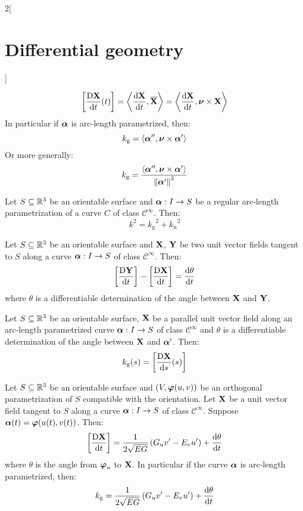 \documentclass[../../../main_math.tex]{subfiles}
\begin{document}
\begin{multicols}{2}[\section{Differential geometry}]
\begin{proposition}
    $$\left[\frac{\text{D}\boldsymbol{\mathrm{X}}}{\dd{t}}(t)\right]=\left\langle\dv{\boldsymbol{\mathrm{X}}}{t},\boldsymbol{\mathrm{\overline{X}}}\right\rangle=\left\langle\dv{\boldsymbol{\mathrm{X}}}{t},\boldsymbol{\mathrm{\nu}}\times\boldsymbol{\mathrm{X}}\right\rangle$$
    In particular if $\boldsymbol{\mathrm{\alpha}}$ is arc-length parametrized, then: $$k_\text{g}=\langle\boldsymbol{\mathrm{\alpha}}'',\boldsymbol{\mathrm{\nu}}\times\boldsymbol{\mathrm{\alpha}}'\rangle$$ Or more generally: $$k_\text{g}=\frac{\langle\boldsymbol{\mathrm{\alpha}}'',\boldsymbol{\mathrm{\nu}}\times\boldsymbol{\mathrm{\alpha}}'\rangle}{{\|\boldsymbol{\mathrm{\alpha}}'\|}^3}$$
  \end{proposition}
  \begin{proposition}
    Let $S\subseteq\mathbb{R}^3$ be an orientable surface and $\boldsymbol{\mathrm{\alpha}}:I\rightarrow S$ be a regular arc-length parametrization of a curve $C$ of class $\mathcal{C}^\infty$. Then: $$k^2={k_{\text{g}}}^2+{k_\text{n}}^2$$
  \end{proposition}
  \begin{proposition}
    Let $S\subseteq\mathbb{R}^3$ be an orientable surface and $\boldsymbol{\mathrm{X}}$, $\boldsymbol{\mathrm{Y}}$ be two unit vector fields tangent to $S$ along a curve $\boldsymbol{\mathrm{\alpha}}:I\rightarrow S$ of class $\mathcal{C}^\infty$. Then: $$\left[\frac{\text{D}\boldsymbol{\mathrm{Y}}}{\dd{t}}\right]-\left[\frac{\text{D}\boldsymbol{\mathrm{X}}}{\dd{t}}\right]=\dv{\theta}{t}$$ where $\theta$ is a differentiable determination of the angle between $\boldsymbol{\mathrm{X}}$ and $\boldsymbol{\mathrm{Y}}$.
  \end{proposition}
  \begin{corollary}
    Let $S\subseteq\mathbb{R}^3$ be an orientable surface, $\boldsymbol{\mathrm{X}}$ be a parallel unit vector field along an arc-length parametrized curve $\boldsymbol{\mathrm{\alpha}}:I\rightarrow S$ of class $\mathcal{C}^\infty$ and $\theta$ is a differentiable determination of the angle between $\boldsymbol{\mathrm{X}}$ and $\boldsymbol{\mathrm{\alpha}}'$. Then: $$k_\text{g}(s)=\left[\frac{\text{D}\boldsymbol{\mathrm{X}}}{\dd{s}}(s)\right]$$
  \end{corollary}
  \begin{proposition}
    Let $S\subseteq\mathbb{R}^3$ be an orientable surface and $(V,\boldsymbol{\mathrm{\varphi}}(u,v))$ be an orthogonal parametrization of $S$ compatible with the orientation. Let $\boldsymbol{\mathrm{X}}$ be a unit vector field tangent to $S$ along a curve $\boldsymbol{\mathrm{\alpha}}:I\rightarrow S$ of class $\mathcal{C}^\infty$. Suppose $\boldsymbol{\mathrm{\alpha}}(t)=\boldsymbol{\mathrm{\varphi}}(u(t),v(t))$. Then: $$\left[\frac{\text{D}\boldsymbol{\mathrm{X}}}{\dd{t}}\right]=\frac{1}{2\sqrt{EG}}\left(G_uv'-E_vu'\right)+\dv{\theta}{t}$$
    where $\theta$ is the angle from $\boldsymbol{\mathrm{\varphi}}_u$ to $\boldsymbol{\mathrm{X}}$. In particular if the curve $\boldsymbol{\mathrm{\alpha}}$ is arc-length parametrized, then:
    $$k_\text{g}=\frac{1}{2\sqrt{EG}}\left(G_uv'-E_vu'\right)+\dv{\theta}{t}$$
  \end{proposition}
  \begin{theorem}

\end{theorem}
\end{multicols}
\end{document}
